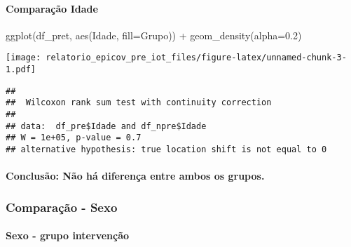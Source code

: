 \documentclass[
]{article}
\newenvironment{Shaded}{\begin{snugshade}}{\end{snugshade}}
\newcommand{\AttributeTok}[1]{\textcolor[rgb]{0.77,0.63,0.00}{#1}}
\newcommand{\FloatTok}[1]{\textcolor[rgb]{0.00,0.00,0.81}{#1}}
\newcommand{\FunctionTok}[1]{\textcolor[rgb]{0.00,0.00,0.00}{#1}}
\newcommand{\NormalTok}[1]{#1}
\newcommand{\SpecialCharTok}[1]{\textcolor[rgb]{0.00,0.00,0.00}{#1}}
\begin{document}
\hypertarget{comparauxe7uxe3o-idade-1}{%
\paragraph{\texorpdfstring{\textbf{Comparação
Idade}}{Comparação Idade}}\label{comparauxe7uxe3o-idade-1}}

\begin{Shaded}
\begin{Highlighting}[]
\FunctionTok{ggplot}\NormalTok{(df\_pret, }\FunctionTok{aes}\NormalTok{(Idade, }\AttributeTok{fill=}\NormalTok{Grupo)) }\SpecialCharTok{+}
  \FunctionTok{geom\_density}\NormalTok{(}\AttributeTok{alpha=}\FloatTok{0.2}\NormalTok{)}
\end{Highlighting}
\end{Shaded}

\texttt{[image: relatorio\_epicov\_pre\_iot\_files/figure-latex/unnamed-chunk-3-1.pdf]}

\begin{Shaded}
\end{Shaded}

\begin{verbatim}
## 
##  Wilcoxon rank sum test with continuity correction
## 
## data:  df_pre$Idade and df_npre$Idade
## W = 1e+05, p-value = 0.7
## alternative hypothesis: true location shift is not equal to 0
\end{verbatim}

\hypertarget{conclusuxe3o-nuxe3o-huxe1-diferenuxe7a-entre-ambos-os-grupos.}{%
\paragraph{Conclusão: Não há diferença entre ambos os
grupos.}\label{conclusuxe3o-nuxe3o-huxe1-diferenuxe7a-entre-ambos-os-grupos.}}

\hypertarget{comparauxe7uxe3o---sexo}{%
\subsubsection{\texorpdfstring{\textbf{Comparação -
Sexo}}{Comparação - Sexo}}\label{comparauxe7uxe3o---sexo}}

\hypertarget{sexo---grupo-intervenuxe7uxe3o}{%
\paragraph{\texorpdfstring{\textbf{Sexo - grupo
intervenção}}{Sexo - grupo intervenção}}\label{sexo---grupo-intervenuxe7uxe3o}}
\end{document}
